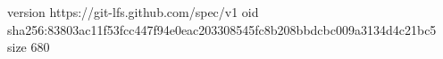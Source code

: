 version https://git-lfs.github.com/spec/v1
oid sha256:83803ac11f53fcc447f94e0eac203308545fc8b208bbdcbc009a3134d4c21bc5
size 680
